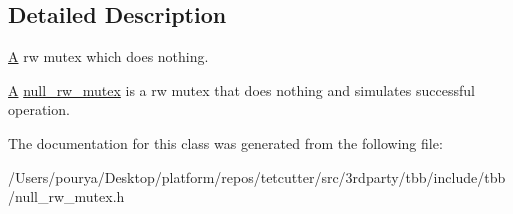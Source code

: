 \subsection{Detailed Description}
\hyperlink{structA}{A} rw mutex which does nothing. 

\hyperlink{structA}{A} \hyperlink{classtbb_1_1null__rw__mutex}{null\+\_\+rw\+\_\+mutex} is a rw mutex that does nothing and simulates successful operation. 

The documentation for this class was generated from the following file\+:\begin{DoxyCompactItemize}
\item 
/\+Users/pourya/\+Desktop/platform/repos/tetcutter/src/3rdparty/tbb/include/tbb/null\+\_\+rw\+\_\+mutex.\+h\end{DoxyCompactItemize}
